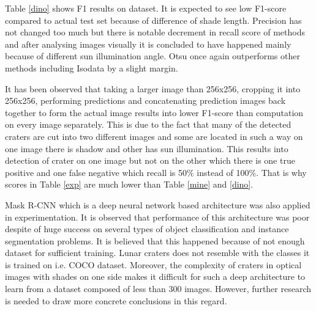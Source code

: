 \documentclass[11pt]{article}
\begin{document}
Table \ref{dino} shows F1 results on \cite{dino2020} dataset. It is expected to see low F1-score compared to actual test set because of difference of shade length. Precision has not changed too much but there is notable decrement in recall score of methods and after analysing images visually it is concluded to have happened mainly because of different sun illumination angle. Otsu once again outperforms other methods including Isodata by a slight margin.

It has been observed that taking a larger image than 256x256, cropping it into 256x256, performing predictions and concatenating prediction images back together to form the actual image results into lower F1-score than computation on every image separately. This is due to the fact that many of the detected craters are cut into two different images and some are located in such a way on one image there is shadow and other has sun illumination. This results into detection of crater on one image but not on the other which there is one true positive and one false negative which recall is 50\% instead of 100\%. That is why scores in Table \ref{exp} are much lower than Table \ref{mine} and \ref{dino}.

Mask R-CNN which is a deep neural network based architecture was also applied in experimentation. It is observed that performance of this architecture was poor despite of huge success on several types of object classification and instance segmentation problems. It is believed that this happened because of not enough dataset for sufficient training. Lunar craters does not resemble with the classes it is trained on i.e. COCO dataset. Moreover, the complexity of craters in optical images with shades on one side makes it difficult for such a deep architecture to learn from a dataset composed of less than 300 images. However, further research is needed to draw more concrete conclusions in this regard.
 
\end{document}
